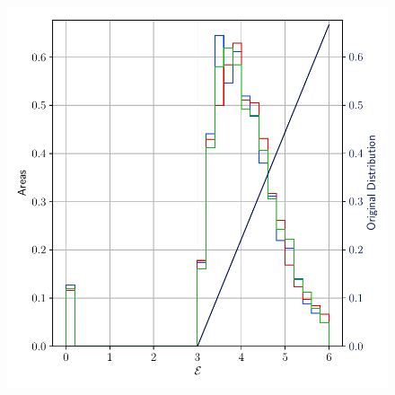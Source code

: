 \begin{figure}[ht]
{    \includegraphics[scale=0.45, trim={0em 0 0em 0}]{figures/stored_energy/SE/se/000070_nuclconstant_set.pdf}
    \label{fig:SE_se_1}
    }\\%
\end{figure}
